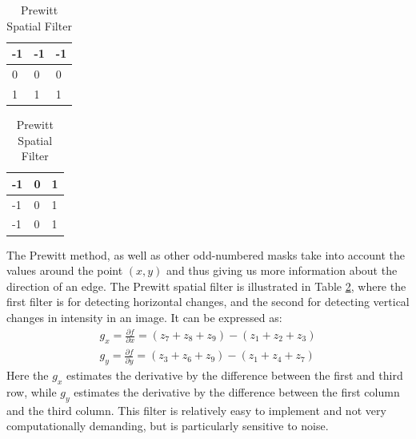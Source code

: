 \begin{table}[h]
\centering
\caption{Prewitt Spatial Filter}
\begin{tabular}{|l|l|l|}
\hline
-1 & -1 & -1 \\ \hline
0  & 0 & 0 \\ \hline
1 & 1 & 1 \\\hline
\end{tabular}
\quad
\begin{tabular}{|l|l|l|}
\hline
-1 & 0 & 1 \\ \hline
-1 & 0 & 1 \\ \hline
-1 & 0 & 1 \\ \hline
\end{tabular}
\label{prewitt}
\end{table}
The Prewitt method, as well as other odd-numbered masks take into account the values around the point $(x,y)$ and thus giving us more information about the direction of an edge. The Prewitt spatial filter is illustrated in Table \ref{prewitt}, where the first filter is for detecting horizontal changes, and the second for detecting vertical changes in intensity in an image. It can be expressed as:
\begin{align*}
g_x = \frac{\partial f}{\partial x} = (z_7+z_8+z_9)-(z_1+z_2+z_3)\\
g_y = \frac{\partial f}{\partial y} = (z_3 + z_6+z_9) - (z_1+z_4+z_7)
\end{align*}
Here the $g_x$ estimates the derivative by the difference between the first and third row, while $g_y$ estimates the derivative by the difference between the first column and the third column. This filter is relatively easy to implement and not very computationally demanding, but is particularly sensitive to noise.

